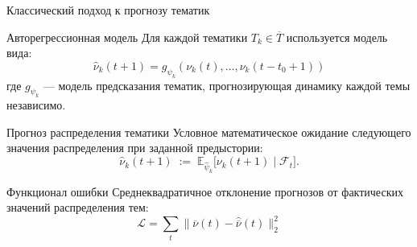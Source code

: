 \documentclass{beamer}
\begin{document}
\begin{frame}{Классический подход к прогнозу тематик}
\begin{block}{Авторегрессионная модель}
Для каждой тематики $T_k\in\overline{T}$ используется модель вида:
\footnotesize
\[
\widehat{\nu}_k(t+1) = g_{\psi_k}(\nu_k(t), \dots, \nu_k(t - t_0 + 1))
\]
\normalsize
где $g_{\psi_k}$ — модель предсказания тематик, прогнозирующая динамику каждой темы независимо.
\end{block}

\begin{block}{Прогноз распределения тематики}
Условное математическое ожидание следующего значения распределения при заданной предыстории:
\footnotesize
\[
\widehat{\nu}_k(t+1)
\;:=\;
\mathbb{E}_{\widehat{\psi}_k}\!\bigl[\nu_k(t+1)\mid\mathcal F_t\bigr].
\]
\normalsize
\end{block}

\vspace{-0.5cm}
\begin{block}{Функционал ошибки}
Среднеквадратичное отклонение прогнозов от фактических значений распределения тем:
\footnotesize
\[
\mathcal{L} = \sum_{t}
\|\overline{\nu}(t) - \widehat{\overline{\nu}}(t)\|_2^2
\]
\normalsize
\end{block}
\end{frame}
\end{document}

